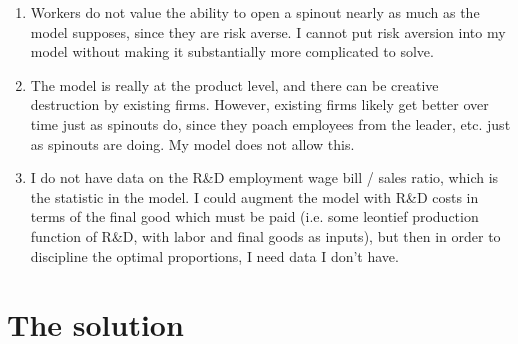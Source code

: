 \documentclass[12pt,english]{article}
\theoremstyle{remark}
\begin{document}
\begin{enumerate}
	\item Workers do not value the ability to open a spinout nearly as much as the model supposes, since they are risk averse. I cannot put risk aversion into my model without making it substantially more complicated to solve. 
	\item The model is really at the product level, and there can be creative destruction by existing firms. However, existing firms likely get better over time just as spinouts do, since they poach employees from the leader, etc. just as spinouts are doing. My model does not allow this. 
	\item I do not have data on the R\&D employment wage bill / sales ratio, which is the statistic in the model. I could augment the model with R\&D costs in terms of the final good which must be paid (i.e. some leontief production function of R\&D, with labor and final goods as inputs), but then in order to discipline the optimal proportions, I need data I don't have.
\end{enumerate}


\section{The solution}
\end{document}
